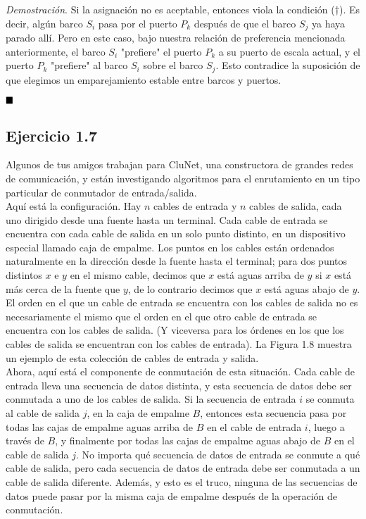 \documentclass{article}
\begin{document}
\textit{Demostración}. Si la asignación no es aceptable, entonces viola la condición (†). Es decir, algún barco $S_i$ pasa por el puerto $P_k$ después de que el barco $S_j$ ya haya parado allí. Pero en este caso, bajo nuestra relación de preferencia mencionada anteriormente, el barco $S_i$ "prefiere" el puerto $P_k$ a su puerto de escala actual, y el puerto $P_k$ "prefiere" al barco $S_i$ sobre el barco $S_j$. Esto contradice la suposición de que elegimos un emparejamiento estable entre barcos y puertos.

$\hfill\blacksquare$

\newpage

\subsection{Ejercicio 1.7}

Algunos de tus amigos trabajan para CluNet, una constructora de grandes redes de comunicación, y están investigando algoritmos para el enrutamiento en un tipo particular de conmutador de entrada/salida.\\

Aquí está la configuración. Hay $n$ cables de entrada y $n$ cables de salida, cada uno dirigido desde una fuente hasta un terminal. Cada cable de entrada se encuentra con cada cable de salida en un solo punto distinto, en un dispositivo especial llamado caja de empalme. Los puntos en los cables están ordenados naturalmente en la dirección desde la fuente hasta el terminal; para dos puntos distintos $x$ e $y$ en el mismo cable, decimos que $x$ está aguas arriba de $y$ si $x$ está más cerca de la fuente que $y$, de lo contrario decimos que $x$ está aguas abajo de $y$. El orden en el que un cable de entrada se encuentra con los cables de salida no es necesariamente el mismo que el orden en el que otro cable de entrada se encuentra con los cables de salida. (Y viceversa para los órdenes en los que los cables de salida se encuentran con los cables de entrada). La Figura 1.8 muestra un ejemplo de esta colección de cables de entrada y salida.\\

Ahora, aquí está el componente de conmutación de esta situación. Cada cable de entrada lleva una secuencia de datos distinta, y esta secuencia de datos debe ser conmutada a uno de los cables de salida. Si la secuencia de entrada $i$ se conmuta al cable de salida $j$, en la caja de empalme $B$, entonces esta secuencia pasa por todas las cajas de empalme aguas arriba de $B$ en el cable de entrada $i$, luego a través de $B$, y finalmente por todas las cajas de empalme aguas abajo de $B$ en el cable de salida $j$. No importa qué secuencia de datos de entrada se conmute a qué cable de salida, pero cada secuencia de datos de entrada debe ser conmutada a un cable de salida diferente. Además, y esto es el truco, ninguna de las secuencias de datos puede pasar por la misma caja de empalme después de la operación de conmutación.\\
\end{document}

